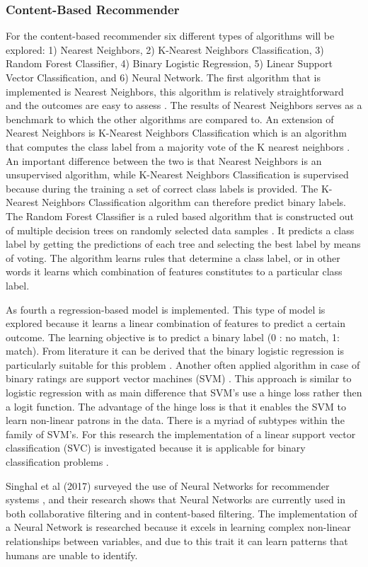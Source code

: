 \subsubsection{Content-Based Recommender}
For the content-based recommender six different types of algorithms will be explored: 1) Nearest Neighbors, 2) K-Nearest Neighbors Classification, 3) Random Forest Classifier, 4) Binary Logistic Regression, 5) Linear Support Vector Classification, and 6) Neural Network. 
The first algorithm that is implemented is Nearest Neighbors, this algorithm is relatively straightforward and the outcomes are easy to assess 
\cite{aggarwal2016recommender}. 
The results of Nearest Neighbors serves as a benchmark to which the other algorithms are compared to. 
An extension of Nearest Neighbors is K-Nearest Neighbors Classification which is an algorithm that computes the class label from a majority vote of the K nearest neighbors \cite{NearestNeighbors}. 
An important difference between the two is that Nearest Neighbors is an unsupervised algorithm, while K-Nearest Neighbors Classification is supervised because during the training a set of correct class labels is provided.
The K-Nearest Neighbors Classification algorithm can therefore predict binary labels.
The Random Forest Classifier is a ruled based algorithm that is constructed out of multiple decision trees on randomly selected data samples \cite{breiman2001random}.
It predicts a class label by getting the predictions of each tree and selecting the best label by means of voting.
The algorithm learns rules that determine a class label, or in other words it learns which combination of features constitutes to a particular class label.

As fourth a regression-based model is implemented.
This type of model is explored because it learns a linear combination of features to predict a certain outcome. 
The learning objective is to predict a binary label (0 : no match, 1: match). 
From literature it can be derived that the binary logistic regression is particularly suitable for this problem \cite{aggarwal2016recommender}. 
Another often applied algorithm in case of binary ratings are support vector machines (SVM) \cite{burges1998tutorial}. 
This approach is similar to logistic regression with as main difference that SVM’s use a hinge loss rather then a logit function.
The advantage of the hinge loss is that it enables the SVM to learn non-linear patrons in the data. 
There is a myriad of subtypes within the family of SVM’s. For  this research the implementation of a linear support vector classification (SVC) is investigated because it is applicable for binary classification problems \cite{fan2008liblinear}. 

Singhal et al (2017) surveyed the use of Neural Networks for recommender systems \cite{singhal2017use}, and their research shows that Neural Networks are currently used in both collaborative filtering and in content-based filtering. 
The implementation of a Neural Network is researched because it excels in learning complex non-linear relationships between variables, and due to this trait it can learn patterns that humans are unable to identify. 
